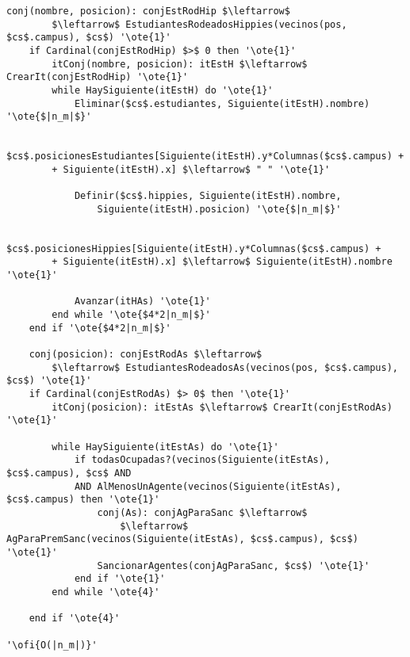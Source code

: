 \begin{lstlisting}[mathescape]
	conj(nombre, posicion): conjEstRodHip $\leftarrow$
		$\leftarrow$ EstudiantesRodeadosHippies(vecinos(pos, $cs$.campus), $cs$) '\ote{1}'
	if Cardinal(conjEstRodHip) $>$ 0 then '\ote{1}'
		itConj(nombre, posicion): itEstH $\leftarrow$ CrearIt(conjEstRodHip) '\ote{1}'
		while HaySiguiente(itEstH) do '\ote{1}'
			Eliminar($cs$.estudiantes, Siguiente(itEstH).nombre) '\ote{$|n_m|$}'

			$cs$.posicionesEstudiantes[Siguiente(itEstH).y*Columnas($cs$.campus) +
		+ Siguiente(itEstH).x] $\leftarrow$ " " '\ote{1}'

			Definir($cs$.hippies, Siguiente(itEstH).nombre,
				Siguiente(itEstH).posicion) '\ote{$|n_m|$}'

			$cs$.posicionesHippies[Siguiente(itEstH).y*Columnas($cs$.campus) +
		+ Siguiente(itEstH).x] $\leftarrow$ Siguiente(itEstH).nombre '\ote{1}'

			Avanzar(itHAs) '\ote{1}'
		end while '\ote{$4*2|n_m|$}'
	end if '\ote{$4*2|n_m|$}'

	conj(posicion): conjEstRodAs $\leftarrow$
		$\leftarrow$ EstudiantesRodeadosAs(vecinos(pos, $cs$.campus), $cs$) '\ote{1}'
	if Cardinal(conjEstRodAs) $> 0$ then '\ote{1}'
		itConj(posicion): itEstAs $\leftarrow$ CrearIt(conjEstRodAs) '\ote{1}'

		while HaySiguiente(itEstAs) do '\ote{1}'
			if todasOcupadas?(vecinos(Siguiente(itEstAs), $cs$.campus), $cs$ AND
			AND AlMenosUnAgente(vecinos(Siguiente(itEstAs), $cs$.campus) then '\ote{1}'
				conj(As): conjAgParaSanc $\leftarrow$
					$\leftarrow$ AgParaPremSanc(vecinos(Siguiente(itEstAs), $cs$.campus), $cs$) '\ote{1}'
				SancionarAgentes(conjAgParaSanc, $cs$) '\ote{1}'
			end if '\ote{1}'
		end while '\ote{4}'

	end if '\ote{4}'

'\ofi{O(|n_m|)}'


\end{lstlisting}

